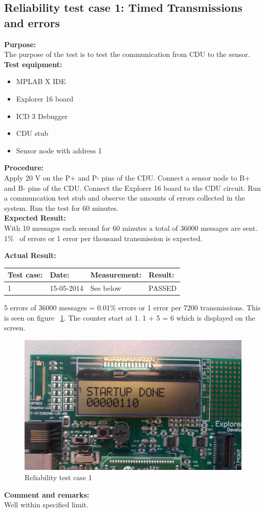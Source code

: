 \subsection{Reliability test case 1: Timed Transmissions and errors}
\textbf{Purpose:}\\
The purpose of the test is to test the communication from CDU to the sensor.\\

\textbf{Test equipment:}
\begin{itemize}
\item MPLAB X IDE
\item Explorer 16 board
\item ICD 3 Debugger
\item CDU stub
\item Sensor node with address 1
\end{itemize}

\textbf{Procedure:}\\
Apply 20 V on the P+ and P- pins of the CDU. Connect a sensor node to B+ and B- pins of the CDU. Connect the Explorer 16 board to the CDU circuit. Run a communcation test stub and observe the amounts of errors collected in the system. Run the test for 60 minutes.\\

\textbf{Expected Result:}\\
With 10 messages each second for 60 minutes a total of 36000 messages are sent. 1\% ~of errors or 1 error per thousand transmission is expected.

\textbf{Actual Result:}\\
\begin{table}[H]
\centering
\begin{tabular}{|p{2cm}|p{2cm}|p{3cm}|p{2cm}|}\hline
\textbf{Test case:} & \textbf{Date:} & \textbf{Measurement:} & \textbf{Result:} \\ \hline
1 & 15-05-2014 & See below & PASSED \\ \hline
\end{tabular}
\end{table}
5 errors of 36000 messages = 0.01\% errors or 1 error per 7200 transmissions. This is seen on figure ~\ref{fig:Reliacase1}. The counter start at 1. 1 + 5 = 6 which is displayed on the screen.
\begin{figure}[H]
\centering
\includegraphics[width=1\textwidth]{billeder/reliabilitytestcase1}
\caption{Reliability test case 1}
\label{fig:Reliacase1}
\end{figure}

\textbf{Comment and remarks:}\\
Well within specified limit.\\